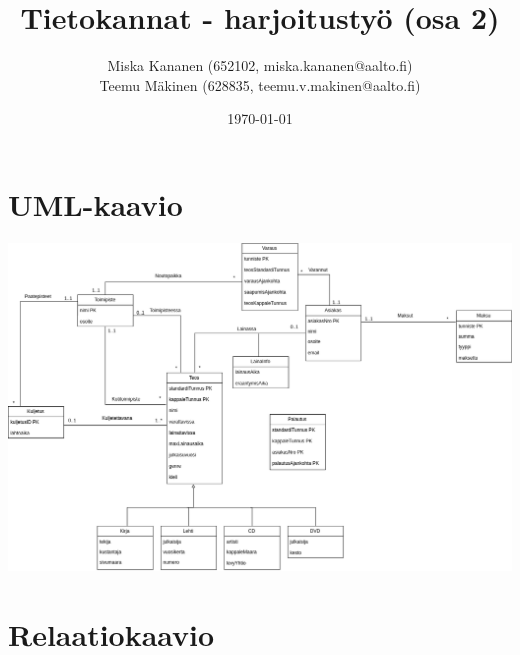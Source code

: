 \documentclass[12pt,titlepage] {article}
\begin{document}
\title {Tietokannat - harjoitustyö (osa 2)}
\author {Miska Kananen (652102, miska.kananen@aalto.fi) \\ Teemu Mäkinen (628835, teemu.v.makinen@aalto.fi)}
\date {\today}
\maketitle

\section {UML-kaavio}

\includegraphics[width=\textwidth]{kirjasto.png}

\section {Relaatiokaavio}
\end{document}
